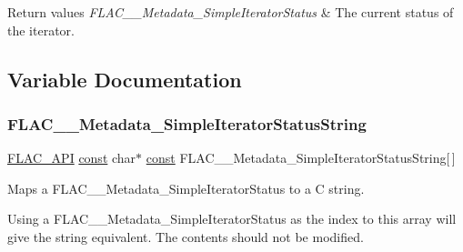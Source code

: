 \begin{DoxyRetVals}{Return values}
{\em F\+L\+A\+C\+\_\+\+\_\+\+Metadata\+\_\+\+Simple\+Iterator\+Status} & The current status of the iterator. \\
\hline
\end{DoxyRetVals}


\subsection{Variable Documentation}
\mbox{\label{group__flac__metadata__level1_ga28ea4a13fcbe97a732fafb13417036bb}} 
\subsubsection{\texorpdfstring{F\+L\+A\+C\+\_\+\+\_\+\+Metadata\+\_\+\+Simple\+Iterator\+Status\+String}{FLAC\_\_Metadata\_SimpleIteratorStatusString}}
{\footnotesize\ttfamily \hyperlink{group__flac__export_ga56ca07df8a23310707732b1c0007d6f5}{F\+L\+A\+C\+\_\+\+A\+PI} \hyperlink{zconf_8h_a2c212835823e3c54a8ab6d95c652660e}{const} char$\ast$ \hyperlink{zconf_8h_a2c212835823e3c54a8ab6d95c652660e}{const} F\+L\+A\+C\+\_\+\+\_\+\+Metadata\+\_\+\+Simple\+Iterator\+Status\+String\mbox{[}$\,$\mbox{]}}

Maps a F\+L\+A\+C\+\_\+\+\_\+\+Metadata\+\_\+\+Simple\+Iterator\+Status to a C string.

Using a F\+L\+A\+C\+\_\+\+\_\+\+Metadata\+\_\+\+Simple\+Iterator\+Status as the index to this array will give the string equivalent. The contents should not be modified. 